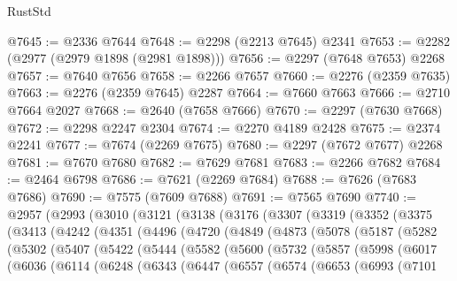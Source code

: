 \begin{lexlean}{RustStd}
\begin{coremodule}
@7645 := @2336 @7644
@7648 := @2298 (@2213 @7645) @2341
@7653 := @2282 (@2977 (@2979 @1898 (@2981 @1898)))
@7656 := @2297 (@7648 @7653) @2268
@7657 := @7640 @7656
@7658 := @2266 @7657
@7660 := @2276 (@2359 @7635)
@7663 := @2276 (@2359 @7645) @2287
@7664 := @7660 @7663
@7666 := @2710 @7664 @2027
@7668 := @2640 (@7658 @7666)
@7670 := @2297 (@7630 @7668)
@7672 := @2298 @2247 @2304
@7674 := @2270 @4189 @2428
@7675 := @2374 @2241
@7677 := @7674 (@2269 @7675)
@7680 := @2297 (@7672 @7677) @2268
@7681 := @7670 @7680
@7682 := @7629 @7681
@7683 := @2266 @7682
@7684 := @2464 @6798
@7686 := @7621 (@2269 @7684)
@7688 := @7626 (@7683 @7686)
@7690 := @7575 (@7609 @7688)
@7691 := @7565 @7690
@7740 := @2957
    (@2993
      (@3010
        (@3121
          (@3138
            (@3176
              (@3307
                (@3319
                  (@3352
                    (@3375
                      (@3413
                        (@4242
                          (@4351
                            (@4496
                              (@4720
                                (@4849
                                  (@4873
                                    (@5078
                                      (@5187
                                        (@5282
                                          (@5302
                                            (@5407
                                              (@5422
                                                (@5444
                                                  (@5582
                                                    (@5600
                                                      (@5732
                                                        (@5857
                                                          (@5998
                                                            (@6017
                                                              (@6036
                                                                (@6114
                                                                  (@6248
                                                                    (@6343
                                                                      (@6447
                                                                        (@6557
                                                                          (@6574
                                                                            (@6653
                                                                              (@6993
                                                                                (@7101

\end{coremodule}
\end{lexlean}
